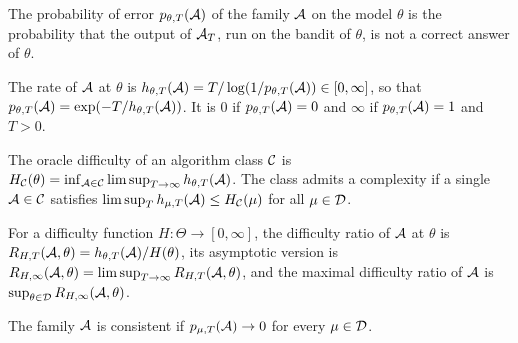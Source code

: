\begin{definition}
  \label{def:error_prob}
  \leanok
  The probability of error $p_{\theta, T}(\mathcal{A})$ of the family $\mathcal{A}$ on the model $\theta$ is the
  probability that the output of $\mathcal{A}_T$, run on the bandit of $\theta$, is not a correct answer
  of $\theta$.
\end{definition}

\begin{definition}
  \label{def:error_rate}
  \leanok
  The rate of $\mathcal{A}$ at $\theta$ is $h_{\theta, T}(\mathcal{A}) = T / \log(1 / p_{\theta, T}(\mathcal{A})) \in
  [0, \infty]$, so that $p_{\theta, T}(\mathcal{A}) = \exp(-T / h_{\theta, T}(\mathcal{A}))$. It is $0$ if
  $p_{\theta, T}(\mathcal{A}) = 0$ and $\infty$ if $p_{\theta, T}(\mathcal{A}) = 1$ and $T > 0$.
\end{definition}

\begin{definition}
  \label{def:oracle_difficulty}
  \leanok
  The oracle difficulty of an algorithm class $\mathcal{C}$ is
  $H_{\mathcal{C}}(\theta) = \inf_{\mathcal{A} \in \mathcal{C}} \limsup_{T \to \infty} h_{\theta, T}(\mathcal{A})$. The class admits
  a complexity if a single $\mathcal{A} \in \mathcal{C}$ satisfies $\limsup_T h_{\mu, T}(\mathcal{A}) \le H_{\mathcal{C}}(\mu)$ for
  all $\mu \in \mathcal{D}$.
\end{definition}

\begin{definition}
  \label{def:difficulty_ratio}
  \leanok
  For a difficulty function $H : \Theta \to [0, \infty]$, the difficulty ratio of $\mathcal{A}$ at
  $\theta$ is $R_{H, T}(\mathcal{A}, \theta) = h_{\theta, T}(\mathcal{A}) / H(\theta)$, its asymptotic version is
  $R_{H, \infty}(\mathcal{A}, \theta) = \limsup_{T \to \infty} R_{H, T}(\mathcal{A}, \theta)$, and the maximal
  difficulty ratio of $\mathcal{A}$ is $\sup_{\theta \in \mathcal{D}} R_{H, \infty}(\mathcal{A}, \theta)$.
\end{definition}

\begin{definition}
  \label{def:consistent}
  \leanok
  The family $\mathcal{A}$ is consistent if $p_{\mu, T}(\mathcal{A}) \to 0$ for every $\mu \in \mathcal{D}$.
\end{definition}

